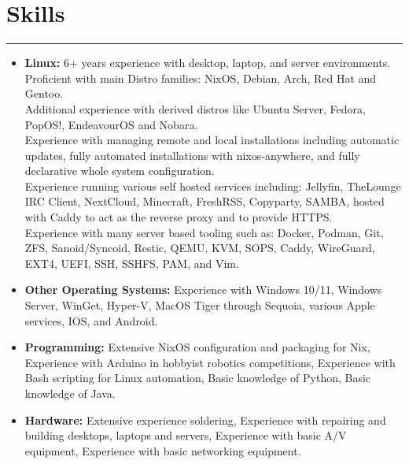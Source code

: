 \documentclass[a4paper,11pt]{article}
\begin{document}
\section*{\hspace*{1em} Skills}
\vspace{-0.2cm}
\hrule
\vspace{0.3cm}
\begin{itemize}
    \item \textbf{Linux:} 6+ years experience with desktop, laptop, and server environments. \\
    Proficient with main Distro families: NixOS, Debian, Arch, Red Hat and Gentoo. \\
    Additional experience with derived distros like Ubuntu Server, Fedora, PopOS!, EndeavourOS and Nobara. \\ 
    Experience with managing remote and local installations including automatic updates, fully automated installations with nixos-anywhere, and fully declarative whole system configuration. \\
    Experience running various self hosted services including: Jellyfin, TheLounge IRC Client, NextCloud, Minecraft, FreshRSS, Copyparty, SAMBA, hosted with Caddy to act as the reverse proxy and to provide HTTPS. \\
    Experience with many server based tooling such as: Docker, Podman, Git, ZFS, Sanoid/Syncoid, Restic, QEMU, KVM, SOPS, Caddy, WireGuard, EXT4, UEFI, SSH, SSHFS, PAM, and Vim. \\
    \vspace{-0.7cm}
    \item \textbf{Other Operating Systems:} Experience with Windows 10/11, Windows Server, WinGet, Hyper-V, MacOS Tiger through Sequoia, various Apple services, IOS, and Android. \\
    \vspace{-0.7cm}
    \item \textbf{Programming:} Extensive NixOS configuration and packaging for Nix, Experience with Arduino in hobbyist robotics competitions, Experience with Bash scripting for Linux automation, Basic knowledge of Python, Basic knowledge of Java. \\
    \vspace{-0.7cm}
    \item \textbf{Hardware:} Extensive experience soldering, Experience with repairing and building desktops, laptops and servers, Experience with basic A/V equipment, Experience with basic networking equipment. \\
\end{itemize} 
\end{document}
